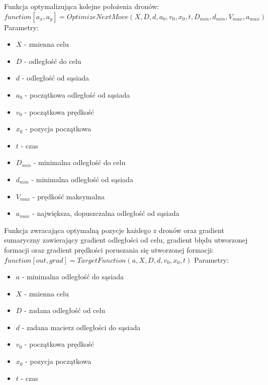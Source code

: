 \documentclass[a4paper, 11pt, oneside]{article}
\begin{document}
Funkcja optymalizująca kolejne położenia dronów:
\newline
$function [a_x,a_y]=OptimizeNextMove(X,D,d,a_{0},v_{0},x_{0},t,D_{min},d_{min},V_{max},a_{max})$
\newline
Parametry:
\begin{itemize}
\item $X$ - zmienna celu
\item $D$ - odległość do celu
\item $d$ -  odległość od sąsiada
\item $a_{0}$ - początkowa odległość od sąsiada
\item $v_{0}$ - początkowa prędkość
\item $x_{0}$ - pozycja początkowa
\item $t$ -  czas
\item $D_{min}$ - minimalna odległość do celu
\item $d_{min}$ - minimalna odległość od sąsiada
\item $V_{max}$ - prędkość maksymalna
\item $a_{max}$ - największa, dopuszczalna odległość od sąsiada 
\end{itemize}

Funkcja zwracająca optymalną pozycje każdego z dronów oraz gradient sumaryczny zawierający gradient odległości od celu, gradient błędu utworzonej formacji oraz gradient prędkości poruszania się utworzonej formacji:
\newline 
$function [out,grad]=TargetFunction(a,X,D,d,v_{0},x_{0},t)$
\newline
Parametry:
\begin{itemize}
\item $a$ - minimalna odległość do sąsiada
\item $X$ - zmienna celu
\item $D$ - zadana odległość od celu 
\item $d$ - zadana macierz odległości do sąsiada
\item $v_{0}$ - początkowa prędkość
\item $x_{0}$ - pozycja początkowa
\item $t$ -  czas
\end{itemize}
\end{document}

